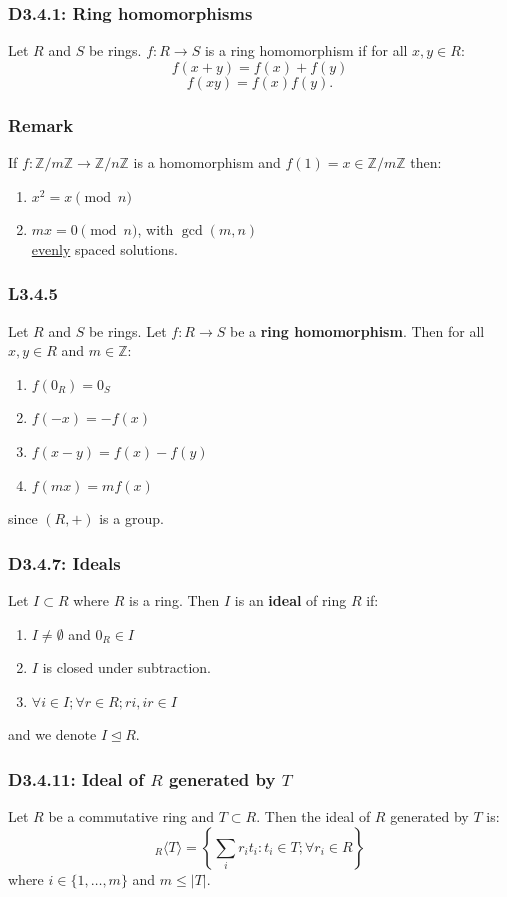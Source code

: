 \documentclass{article}
\begin{document}
\begin{multicols*}{3}
\subsubsection*{D3.4.1: Ring homomorphisms}
Let $R$ and $S$ be rings. $f:R\rightarrow S$ is a ring
homomorphism if for all $x,y\in R$:
$$f(x+y)=f(x)+f(y)$$
$$f(xy)=f(x)f(y).$$

\subsubsection*{Remark}
If $f:\mathbb{Z}/m\mathbb{Z}\rightarrow
\mathbb{Z}/n\mathbb{Z}$ is a homomorphism
and $f(1)=x\in\mathbb{Z}/m\mathbb{Z}$ then:
\begin{enumerate}
    \item $x^2=x \pmod n$
    \item $mx=0 \pmod n$, with $\gcd(m,n)$ \\
    \underline{evenly} spaced solutions.
\end{enumerate}

\subsubsection*{L3.4.5}
Let $R$ and $S$ be rings. Let $f:R\rightarrow S$ be a
\textbf{ring homomorphism}.
Then for all $x,y\in R$ and $m\in\mathbb{Z}$:
\begin{enumerate}
    \item $f(0_R)=0_S$
    \item $f(-x)=-f(x)$
    \item $f(x-y)=f(x)-f(y)$
    \item $f(mx)=mf(x)$
\end{enumerate}
since $(R,+)$ is a group.

\subsubsection*{D3.4.7: Ideals}
Let $I\subset R$ where $R$ is a ring. Then
$I$ is an \textbf{ideal} of ring $R$ if:
\begin{enumerate}
    \item $I\neq\emptyset$ and $0_R\in I$
    \item $I$ is closed under subtraction.
    \item $\forall i\in I;\forall r\in R;
    ri,ir\in I$
\end{enumerate}
and we denote $I\trianglelefteq R$.

\subsubsection*{D3.4.11: Ideal of $R$ generated by $T$}
Let $R$ be a commutative ring and $T\subset R$.
Then the ideal of $R$ generated by $T$ is:
$${}_R\langle T\rangle=\left\{\sum_i r_i t_i
:t_i\in T;\forall r_i\in R\right\}$$
where $i\in\{1,\dots,m\}$ and $m\leq|T|$.


\end{multicols*}
\end{document}
